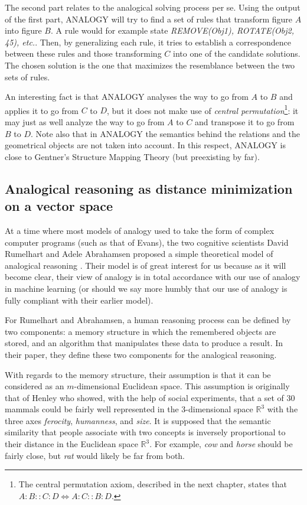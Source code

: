 The second part relates to the analogical solving process per se. Using the
output of the first part, ANALOGY will try to find a set of rules that
transform figure $A$ into figure $B$. A rule would for example state
\textit{REMOVE(Obj1), ROTATE(Obj2, 45\degree), etc.}. Then, by generalizing
each rule, it tries to establish a correspondence between these rules and those
transforming $C$ into one of the candidate solutions. The chosen solution is
the one that maximizes the resemblance between the two sets of rules.

An interesting fact is that ANALOGY analyses the way to go from $A$ to $B$ and
applies it to go from $C$ to $D$, but it does not make use of \textit{central
permutation}\footnote{The central permutation axiom, described in the next
chapter, states that $A:B::C:D \iff A:C::B:D$.}: it may just as well analyze the way to go from $A$ to $C$ and
transpose it to go from $B$ to $D$. Note also that in ANALOGY the semantics
behind the relations and the geometrical objects are not taken into account. In
this respect, ANALOGY is close to Gentner's Structure Mapping Theory (but
preexisting by far).


\subsection{Analogical reasoning as distance minimization on a vector space}
\label{SEC:rumelhart_Abrahamsen}

At a time where most models of analogy used to take the form of complex computer
programs (such as that of Evans), the two cognitive scientists David Rumelhart
and Adele Abrahamsen proposed a simple theoretical model of analogical
reasoning \cite{RumAbr73}. Their model is of great interest for us because as
it will become clear, their view of analogy is in total accordance with our use
of analogy in machine learning (or should we say more humbly that our use of
analogy is fully compliant with their earlier model).

For Rumelhart and Abrahamsen, a human reasoning process can be defined by two
components: a memory structure in which the remembered objects are stored, and
an algorithm that manipulates these data to produce a result. In their paper,
they define these two components for the analogical reasoning.

With regards to the memory structure, their assumption is that it can be
considered as an $m$-dimensional Euclidean space. This assumption is originally
that of Henley \cite{Hen69} who showed, with the help of social experiments,
that a set of 30 mammals could be fairly well represented in the 3-dimensional
space $\mathbb{R}^3$ with the three axes \textit{ferocity}, \textit{humanness},
and \textit{size}. It is supposed that the semantic similarity that people
associate with two concepts is inversely proportional to their distance in the
Euclidean space $\mathbb{R}^3$. For example, \textit{cow} and \textit{horse}
should be fairly close, but \textit{rat} would likely be far from both.

